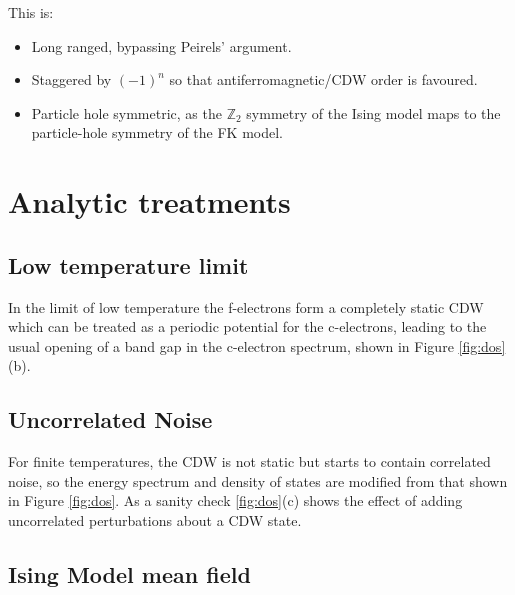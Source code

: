 \documentclass[a4paper, 11pt, onecolumn]{article}
\begin{document}
This is:
\begin{itemize}
    \item Long ranged, bypassing Peirels' argument.
    \item Staggered by $(-1)^n$ so that antiferromagnetic/CDW order is favoured.
    \item Particle hole symmetric, as the $\mathbb{Z}_2$ symmetry of the Ising model maps to the particle-hole symmetry of the FK model.
\end{itemize}

\section{Analytic treatments}
\subsection{Low temperature limit}

In the limit of low temperature the f-electrons form a completely static CDW which can be treated as a periodic potential for the c-electrons, leading to the usual opening of a band gap in the c-electron spectrum, shown in Figure \ref{fig:dos}(b).

\subsection{Uncorrelated Noise}
For finite temperatures, the CDW is not static but starts to contain correlated noise, so the energy spectrum and density of states are modified from that shown in Figure \ref{fig:dos}. As a sanity check \ref{fig:dos}(c) shows the effect of adding uncorrelated perturbations about a CDW state. 

\subsection{Ising Model mean field}
\end{document}
